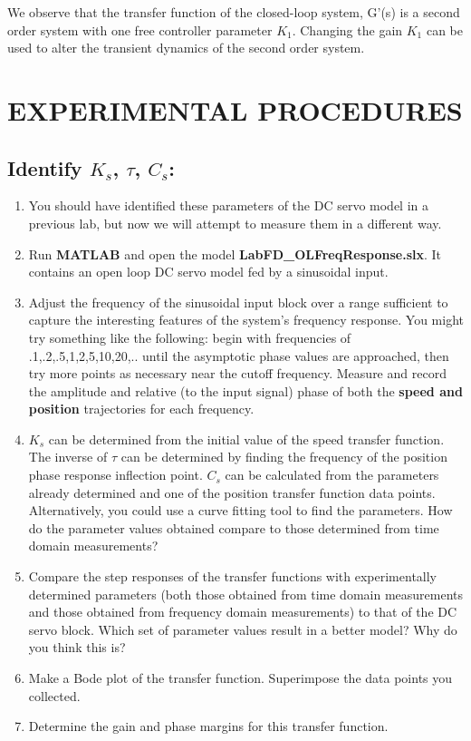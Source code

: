 \documentclass[11pt,a4paper]{article}
\begin{document}
We observe that the transfer function of the closed-loop system, G'(s) is a second order system with one free controller parameter $K_{1}$. Changing the gain $K_{1}$ can be used to alter the transient dynamics of the second order system.


\section{EXPERIMENTAL PROCEDURES}
\subsection{Identify $K_{s}$, $\tau$, $C_{s}$:}
\begin{enumerate}
\item You should have identified these parameters of the DC servo model in a previous lab, but now we will attempt to measure them in a different way.

\item Run \textbf{MATLAB} and open the model \textbf{LabFD\_OLFreqResponse.slx}. It contains an open loop DC servo model fed by a sinusoidal input.

\item Adjust the frequency of the sinusoidal input block over a range sufficient to capture the interesting features of the system's frequency response.  You might try something like the following: begin with frequencies of {.1,.2,.5,1,2,5,10,20,..} until the asymptotic phase values are approached, then try more points as necessary near the cutoff frequency. Measure and record the amplitude and relative (to the input signal) phase of both the \textbf{speed and position} trajectories for each frequency.

\item $K_{s}$ can be determined from the initial value of the speed transfer function. The inverse of $\tau$ can be determined by finding the frequency of the position phase response inflection point. $C_{s}$ can be calculated from the parameters already determined and one of the position transfer function data points. Alternatively, you could  use a curve fitting tool to find the parameters. How do the parameter values obtained compare to those determined from time domain measurements?

\item Compare the step responses of the transfer functions with experimentally determined parameters (both those obtained from time domain measurements and those obtained from frequency domain measurements) to that of the DC servo block. Which set of parameter values result in a better model? Why do you think this is?

\item Make a Bode plot of the transfer function. Superimpose the data points you collected.

\item Determine the gain and phase margins for this transfer function.

\end{enumerate}
\end{document}
